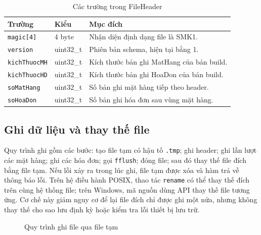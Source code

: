 \begin{table}[H]
\centering
\caption{Các trường trong FileHeader}
\label{tab:file_header}
\small
\begin{tabular}{@{}p{3cm}p{2.5cm}p{6.5cm}@{}}
\toprule
\textbf{Trường} & \textbf{Kiểu} & \textbf{Mục đích} \\
\midrule
\texttt{magic[4]} & 4 byte & Nhận diện định dạng file là SMK1. \\
\texttt{version} & uint32\_t & Phiên bản schema, hiện tại bằng 1. \\
\texttt{kichThuocMH} & uint32\_t & Kích thước bản ghi MatHang của bản build. \\
\texttt{kichThuocHD} & uint32\_t & Kích thước bản ghi HoaDon của bản build. \\
\texttt{soMatHang} & uint32\_t & Số bản ghi mặt hàng tiếp theo header. \\
\texttt{soHoaDon} & uint32\_t & Số bản ghi hóa đơn sau vùng mặt hàng. \\
\bottomrule
\end{tabular}
\end{table}

\subsection{Ghi dữ liệu và thay thế file}
Quy trình ghi gồm các bước: tạo file tạm có hậu tố \texttt{.tmp}; ghi header; ghi lần lượt các mặt hàng; ghi các hóa đơn; gọi \texttt{fflush}; đóng file; sau đó thay thế file đích bằng file tạm. Nếu lỗi xảy ra trong lúc ghi, file tạm được xóa và hàm trả về thông báo lỗi. Trên hệ điều hành POSIX, thao tác \texttt{rename} có thể thay thế đích trên cùng hệ thống file; trên Windows, mã nguồn dùng API thay thế file tương ứng. Cơ chế này giảm nguy cơ để lại file đích chỉ được ghi một nửa, nhưng không thay thế cho sao lưu định kỳ hoặc kiểm tra lỗi thiết bị lưu trữ.

\begin{figure}[H]
\centering
{}
\caption{Quy trình ghi file qua file tạm}
\label{fig:atomic_write}
\end{figure}

